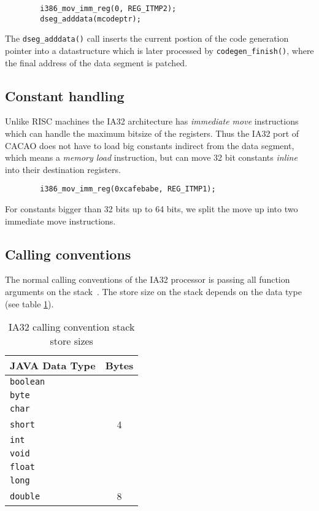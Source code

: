 \begin{verbatim}
        i386_mov_imm_reg(0, REG_ITMP2);
        dseg_adddata(mcodeptr);
\end{verbatim}

The \texttt{dseg\_adddata()} call inserts the current postion of the
code generation pointer into a datastructure which is later processed
by \texttt{codegen\_finish()}, where the final address of the data
segment is patched.


\subsection{Constant handling}

Unlike RISC machines the IA32 architecture has \textit{immediate move}
instructions which can handle the maximum bitsize of the
registers. Thus the IA32 port of CACAO does not have to load big
constants indirect from the data segment, which means a \textit{memory
load} instruction, but can move 32 bit constants \textit{inline} into
their destination registers.

\begin{verbatim}
        i386_mov_imm_reg(0xcafebabe, REG_ITMP1);
\end{verbatim}

For constants bigger than 32 bits up to 64 bits, we split the move
up into two immediate move instructions.


\subsection{Calling conventions}

The normal calling conventions of the IA32 processor is passing all
function arguments on the stack~\cite{IA32vol1}. The store size on the
stack depends on the data type (see table
\ref{ia32callingconventionstackstoresizes}).

\begin{table}
\begin{center}
\begin{tabular}[b]{|l|c|}
\hline
JAVA Data Type   & Bytes \\ \hline
\texttt{boolean} &       \\
\texttt{byte}    &       \\
\texttt{char}    &       \\
\texttt{short}   & 4     \\
\texttt{int}     &       \\
\texttt{void}    &       \\
\texttt{float}   &       \\ \hline
\texttt{long}    &       \\
\texttt{double}  & 8     \\ \hline
\end{tabular}
\caption{IA32 calling convention stack store sizes}
\label{ia32callingconventionstackstoresizes}
\end{center}
\end{table}

